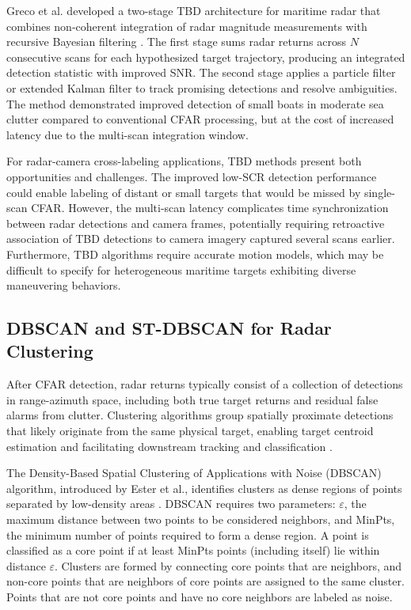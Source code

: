 Greco et al. developed a two-stage TBD architecture for maritime radar that combines non-coherent integration of radar magnitude measurements with recursive Bayesian filtering \cite{Greco2013}. The first stage sums radar returns across $N$ consecutive scans for each hypothesized target trajectory, producing an integrated detection statistic with improved SNR. The second stage applies a particle filter or extended Kalman filter to track promising detections and resolve ambiguities. The method demonstrated improved detection of small boats in moderate sea clutter compared to conventional CFAR processing, but at the cost of increased latency due to the multi-scan integration window.

For radar-camera cross-labeling applications, TBD methods present both opportunities and challenges. The improved low-SCR detection performance could enable labeling of distant or small targets that would be missed by single-scan CFAR. However, the multi-scan latency complicates time synchronization between radar detections and camera frames, potentially requiring retroactive association of TBD detections to camera imagery captured several scans earlier. Furthermore, TBD algorithms require accurate motion models, which may be difficult to specify for heterogeneous maritime targets exhibiting diverse maneuvering behaviors.

\subsection{DBSCAN and ST-DBSCAN for Radar Clustering}

After CFAR detection, radar returns typically consist of a collection of detections in range-azimuth space, including both true target returns and residual false alarms from clutter. Clustering algorithms group spatially proximate detections that likely originate from the same physical target, enabling target centroid estimation and facilitating downstream tracking and classification \cite{Chen2020}.

The Density-Based Spatial Clustering of Applications with Noise (DBSCAN) algorithm, introduced by Ester et al., identifies clusters as dense regions of points separated by low-density areas \cite{ester1996dbscan}. DBSCAN requires two parameters: $\varepsilon$, the maximum distance between two points to be considered neighbors, and MinPts, the minimum number of points required to form a dense region. A point is classified as a core point if at least MinPts points (including itself) lie within distance $\varepsilon$. Clusters are formed by connecting core points that are neighbors, and non-core points that are neighbors of core points are assigned to the same cluster. Points that are not core points and have no core neighbors are labeled as noise.

